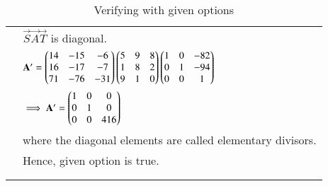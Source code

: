 \documentclass[journal,12pt]{IEEEtran}
\begin{document}
\begin{longtable}{|l|l|}
        & $\vec{S}\vec{A}\vec{T}$ is diagonal.\\
        & $\mathbf{A}' = \begin{pmatrix}14 & -15 & -6\\ 16 & -17 & -7\\71 & -76 & -31\end{pmatrix}\begin{pmatrix}5 & 9 & 8 \\ 1 & 8 & 2\\ 9 & 1 & 0\end{pmatrix}\begin{pmatrix}1 & 0 & -82\\ 0 & 1 & -94\\ 0 & 0 & 1\end{pmatrix}$\\
        & $\implies \mathbf{A}' = \begin{pmatrix}1 & 0 & 0\\0 & 1 & 0\\0 & 0 & 416\end{pmatrix}$\\
        & where the diagonal elements are called elementary divisors.\\
        & Hence, given option is true.\\
        & \\
    \hline
    \caption{Verifying with given options}
    \label{tab:verify}
\end{longtable}
\end{document}
